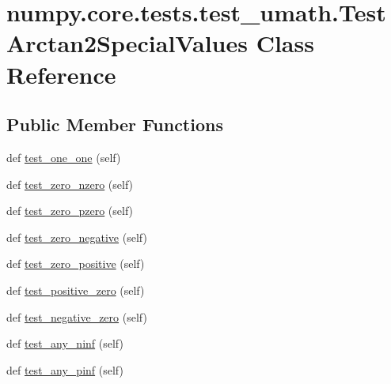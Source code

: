 \hypertarget{classnumpy_1_1core_1_1tests_1_1test__umath_1_1TestArctan2SpecialValues}{}\section{numpy.\+core.\+tests.\+test\+\_\+umath.\+Test\+Arctan2\+Special\+Values Class Reference}
\label{classnumpy_1_1core_1_1tests_1_1test__umath_1_1TestArctan2SpecialValues}
\subsection*{Public Member Functions}
\begin{DoxyCompactItemize}
\item 
def \hyperlink{classnumpy_1_1core_1_1tests_1_1test__umath_1_1TestArctan2SpecialValues_a7c4407e60f003bead6c59c0a992087d6}{test\+\_\+one\+\_\+one} (self)
\item 
def \hyperlink{classnumpy_1_1core_1_1tests_1_1test__umath_1_1TestArctan2SpecialValues_aaacbaefba9fde498185168d02695fa49}{test\+\_\+zero\+\_\+nzero} (self)
\item 
def \hyperlink{classnumpy_1_1core_1_1tests_1_1test__umath_1_1TestArctan2SpecialValues_a03a26c1b9755cbc513596df4443c382d}{test\+\_\+zero\+\_\+pzero} (self)
\item 
def \hyperlink{classnumpy_1_1core_1_1tests_1_1test__umath_1_1TestArctan2SpecialValues_a5acf00386a2ae6377265c70512ca9314}{test\+\_\+zero\+\_\+negative} (self)
\item 
def \hyperlink{classnumpy_1_1core_1_1tests_1_1test__umath_1_1TestArctan2SpecialValues_a39335f20fc04fc7088791870b6995400}{test\+\_\+zero\+\_\+positive} (self)
\item 
def \hyperlink{classnumpy_1_1core_1_1tests_1_1test__umath_1_1TestArctan2SpecialValues_ab43e325fc041f1ed239bc9392dd83cab}{test\+\_\+positive\+\_\+zero} (self)
\item 
def \hyperlink{classnumpy_1_1core_1_1tests_1_1test__umath_1_1TestArctan2SpecialValues_a7c8002bc99acf79afdf8582e1c291fbd}{test\+\_\+negative\+\_\+zero} (self)
\item 
def \hyperlink{classnumpy_1_1core_1_1tests_1_1test__umath_1_1TestArctan2SpecialValues_a0d2128f92246a5de82477e17684bf412}{test\+\_\+any\+\_\+ninf} (self)
\item 
def \hyperlink{classnumpy_1_1core_1_1tests_1_1test__umath_1_1TestArctan2SpecialValues_abfbdfd81de0b8a515bbd8331684cad2c}{test\+\_\+any\+\_\+pinf} (self)

\end{DoxyCompactItemize}
